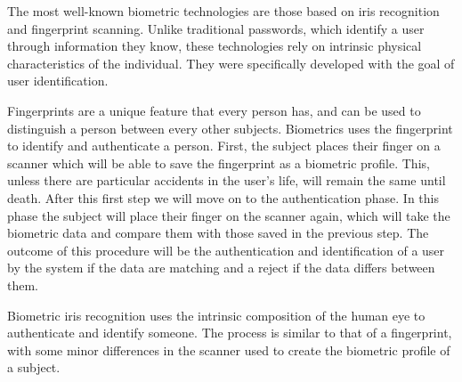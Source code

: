 \documentclass{article}
\begin{document}
The most well-known biometric technologies are those based on iris recognition and fingerprint scanning. 
Unlike traditional passwords, which identify a user through information they know, these technologies rely on intrinsic physical characteristics of the individual.
They were specifically developed with the goal of user identification.

Fingerprints are a unique feature that every person has, and can be used to distinguish a person between every other subjects. 
Biometrics uses the fingerprint to identify and authenticate a person.
First, the subject places their finger on a scanner which will be able to save the fingerprint as a biometric profile.
This, unless there are particular accidents in the user's life, will remain the same until death.
After this first step we will move on to the authentication phase.
In this phase the subject will place their finger on the scanner again, which will take the biometric data and compare them with those saved in the previous step.
The outcome of this procedure will be the authentication and identification of a user by the system if the data are matching and a reject if the data differs between them.

Biometric iris recognition uses the intrinsic composition of the human eye to authenticate and identify someone.
The process is similar to that of a fingerprint, with some minor differences in the scanner used to create the biometric profile of a subject.
\end{document}

